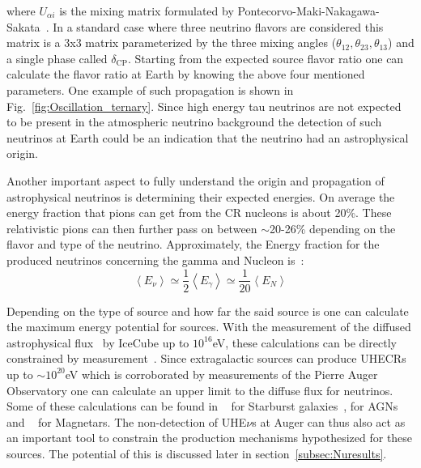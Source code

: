 where $U_{\alpha i}$ is the mixing matrix formulated by Pontecorvo-Maki-Nakagawa-Sakata~\cite{Pontecorvo:1957qd,10.1143/PTP.28.870}. In a standard case where three neutrino flavors are considered this matrix is a 3x3 matrix parameterized by the three mixing angles ($\theta_{12},\theta_{23},\theta_{13}$) and a single phase called $\delta_{\text{CP}}$. Starting from the expected source flavor ratio one can calculate the flavor ratio at Earth by knowing the above four mentioned parameters. One example of such propagation is shown in Fig.~\ref{fig:Oscillation_ternary}. Since high energy tau neutrinos are not expected to be present in the atmospheric neutrino background the detection of such neutrinos at Earth could be an indication that the neutrino had an astrophysical origin. 

Another important aspect to fully understand the origin and propagation of astrophysical neutrinos is determining their expected energies. On average the energy fraction that pions can get from the \gls*{CR} nucleons is about 20\%. These relativistic pions can then further pass on between $\sim$20-26\% depending on the flavor and type of the neutrino. Approximately, the Energy fraction for the produced neutrinos concerning the gamma and Nucleon is~\cite{Lipari_2007}:
\begin{equation}
  \left\langle E_{\nu} \right\rangle  \simeq  \frac{1}{2}\left\langle E_{\gamma} \right\rangle \simeq  \frac{1}{20}\left\langle E_{N} \right\rangle
  \end{equation}

Depending on the type of source and how far the said source is one can calculate the maximum energy potential for sources. With the measurement of the diffused astrophysical flux~\cite{PhysRevD.110.022001} by IceCube up to $10^{16}$eV, these calculations can be directly constrained by measurement~\cite{Abbasi_2023_supernova_emission}. Since extragalactic sources can produce \glspl{UHECR} up to $\sim 10^{20}$eV which is corroborated by measurements of the Pierre Auger Observatory one can calculate an upper limit to the diffuse flux for neutrinos. Some of these calculations can be found in ~\cite{Condorelli_2023_starburst} for Starburst galaxies~\cite{Murase_2023}, for AGNs and ~\cite{2003ApJ...595..346Z} for Magnetars. The non-detection of UHE$\nu$s at Auger can thus also act as an important tool to constrain the production mechanisms hypothesized for these sources. The potential of this is discussed later in section~\ref{subsec:Nuresults}.   

